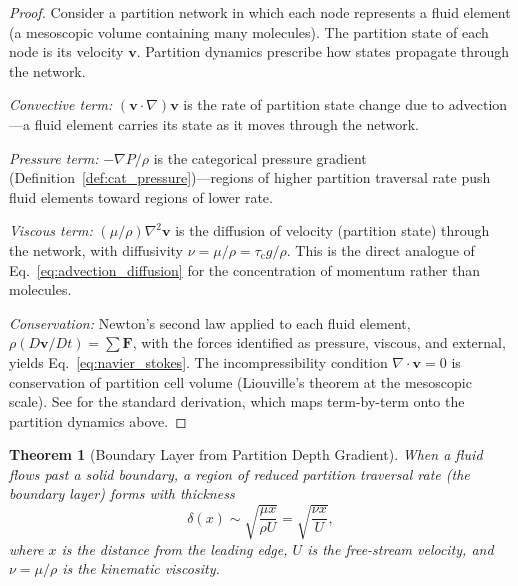\documentclass[11pt,twocolumn,a4paper]{article}
\theoremstyle{plain}
\newtheorem{theorem}{Theorem}[section]
\theoremstyle{definition}
\theoremstyle{remark}
\newcommand{\tauc}{\tau_{\mathrm{c}}}
\begin{document}
\begin{proof}
Consider a partition network in which each node represents a fluid element (a mesoscopic volume containing many molecules). The partition state of each node is its velocity $\mathbf{v}$. Partition dynamics prescribe how states propagate through the network.

\emph{Convective term:} $(\mathbf{v}\cdot\nabla)\mathbf{v}$ is the rate of partition state change due to advection---a fluid element carries its state as it moves through the network.

\emph{Pressure term:} $-\nabla P/\rho$ is the categorical pressure gradient (Definition~\ref{def:cat_pressure})---regions of higher partition traversal rate push fluid elements toward regions of lower rate.

\emph{Viscous term:} $(\mu/\rho)\nabla^2\mathbf{v}$ is the diffusion of velocity (partition state) through the network, with diffusivity $\nu = \mu/\rho = \tauc g/\rho$. This is the direct analogue of Eq.~\eqref{eq:advection_diffusion} for the concentration of momentum rather than molecules.

\emph{Conservation:} Newton's second law applied to each fluid element, $\rho(D\mathbf{v}/Dt) = \sum \mathbf{F}$, with the forces identified as pressure, viscous, and external, yields Eq.~\eqref{eq:navier_stokes}. The incompressibility condition $\nabla\cdot\mathbf{v} = 0$ is conservation of partition cell volume (Liouville's theorem at the mesoscopic scale). See \cite{batchelor2000introduction, landau1987fluid} for the standard derivation, which maps term-by-term onto the partition dynamics above.
\end{proof}

\begin{theorem}[Boundary Layer from Partition Depth Gradient]
\label{thm:boundary_layer}
When a fluid flows past a solid boundary, a region of reduced partition traversal rate (the boundary layer) forms with thickness
\begin{equation}
\delta(x) \sim \sqrt{\frac{\mu x}{\rho U}} = \sqrt{\frac{\nu x}{U}},
\label{eq:boundary_layer}
\end{equation}
where $x$ is the distance from the leading edge, $U$ is the free-stream velocity, and $\nu = \mu/\rho$ is the kinematic viscosity.
\end{theorem}
\end{document}
